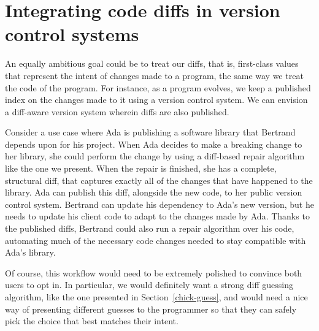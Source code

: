 \section{Integrating code diffs in version control systems}

An equally ambitious goal could be to treat our diffs, that is, first-class
values that represent the intent of changes made to a program, the same way we
treat the code of the program.  For instance, as a program evolves, we keep a
published index on the changes made to it using a version control system.  We
can envision a diff-aware version system wherein diffs are also published.

Consider a use case where Ada is publishing a software library that Bertrand
depends upon for his project.  When Ada decides to make a breaking change to her
library, she could perform the change by using a diff-based repair algorithm
like the one we present.  When the repair is finished, she has a complete,
structural diff, that captures exactly all of the changes that have happened to
the library.  Ada can publish this diff, alongside the new code, to her public
version control system.  Bertrand can update his dependency to Ada's new
version, but he needs to update his client code to adapt to the changes made by
Ada.  Thanks to the published diffs, Bertrand could also run a repair algorithm
over his code, automating much of the necessary code changes needed to stay
compatible with Ada's library.

Of course, this workflow would need to be extremely polished to convince both
users to opt in.  In particular, we would definitely want a strong diff guessing
algorithm, like the one presented in Section~\ref{chick-guess}, and would need a
nice way of presenting different guesses to the programmer so that they can
safely pick the choice that best matches their intent.
